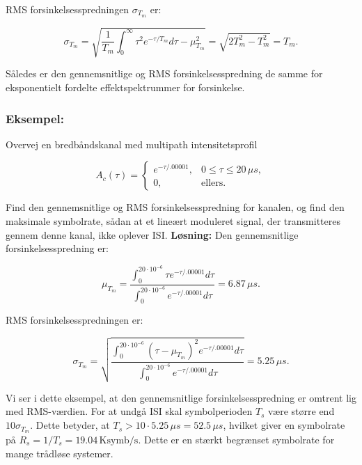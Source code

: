 \documentclass[a4paper,12pt]{book}
\begin{document}
	RMS forsinkelsesspredningen \( \sigma_{T_m} \) er:
	
	\[
	\sigma_{T_m} = \sqrt{\frac{1}{T_m} \int_0^\infty \tau^2 e^{-\tau/T_m} d\tau - \mu_{T_m}^2} = \sqrt{2T_m^2 - T_m^2} = T_m.
	\]
	
	Således er den gennemsnitlige og RMS forsinkelsesspredning de samme for eksponentielt fordelte effektspektrummer for forsinkelse.
	
	\subsubsection{Eksempel:}
	Overvej en bredbåndskanal med multipath intensitetsprofil
	
	\[
	A_c(\tau) = 
	\begin{cases} 
		e^{-\tau / .00001}, & 0 \leq \tau \leq 20 \, \mu s, \\
		0, & \text{ellers}.
	\end{cases}
	\]
	
	Find den gennemsnitlige og RMS forsinkelsesspredning for kanalen, og find den maksimale symbolrate, sådan at et lineært moduleret signal, der transmitteres gennem denne kanal, ikke oplever ISI.
	\newline\newline
	\textbf{Løsning:} Den gennemsnitlige forsinkelsesspredning er:
	
	\[
	\mu_{T_m} = \frac{\int_0^{20 \cdot 10^{-6}} \tau e^{-\tau / .00001} d\tau}{\int_0^{20 \cdot 10^{-6}} e^{-\tau / .00001} d\tau} = 6.87 \, \mu s.
	\]
	
	RMS forsinkelsesspredningen er:
	
	\[
	\sigma_{T_m} = \sqrt{\frac{\int_0^{20 \cdot 10^{-6}} (\tau - \mu_{T_m})^2 e^{-\tau / .00001} d\tau}{\int_0^{20 \cdot 10^{-6}} e^{-\tau / .00001} d\tau}} = 5.25 \, \mu s.
	\]
	
	Vi ser i dette eksempel, at den gennemsnitlige forsinkelsesspredning er omtrent lig med RMS-værdien. For at undgå ISI skal symbolperioden \( T_s \) være større end \( 10\sigma_{T_m} \). Dette betyder, at \( T_s > 10 \cdot 5.25 \, \mu s = 52.5 \, \mu s \), hvilket giver en symbolrate på \( R_s = 1 / T_s = 19.04 \, \text{Ksymb/s} \). Dette er en stærkt begrænset symbolrate for mange trådløse systemer.
	
	
\end{document}
